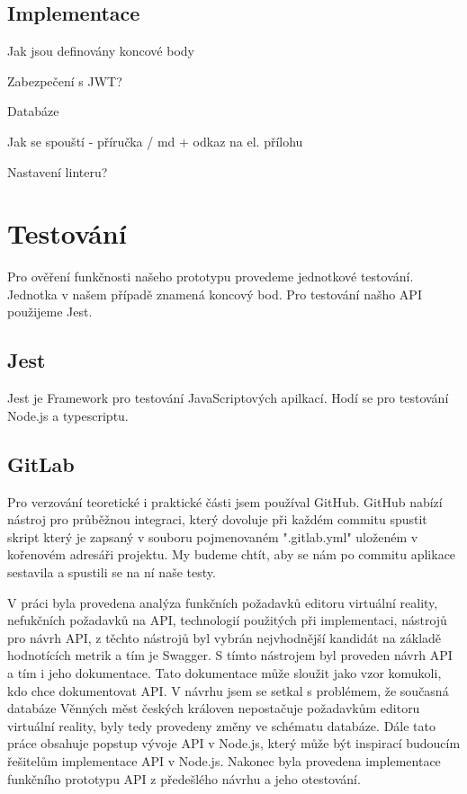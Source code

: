 \documentclass[thesis=B,czech]{FITthesis}[2012/06/26]
\begin{document}
    \section{Implementace}
        Jak jsou definovány koncové body
        
        Zabezpečení s JWT?
        
        Databáze
        
        Jak se spouští - příručka / md + odkaz na el. přílohu
        
        Nastavení linteru?
        
\chapter{Testování}
    Pro ověření funkčnosti našeho prototypu provedeme jednotkové testování. Jednotka v našem případě znamená koncový bod. Pro testování našho API použijeme Jest.

    \section{Jest}
    Jest je Framework pro testování JavaScriptových apilkací. Hodí se pro testování Node.js a typescriptu.


    \section{GitLab}
    Pro verzování teoretické i praktické části jsem používal GitHub. GitHub nabízí nástroj pro průběžnou integraci, který dovoluje při každém commitu spustit skript který je zapsaný v souboru pojmenovaném ".gitlab.yml" uloženém v kořenovém adresáři projektu. My budeme chtít, aby se nám po commitu aplikace sestavila a spustili se na ní naše testy.
    

\begin{conclusion}
    V práci byla provedena analýza funkčních požadavků editoru virtuální reality, nefukčních požadavků na API, technologií použitých při implementaci, nástrojů pro návrh API, z těchto nástrojů byl vybrán nejvhodnější kandidát na základě hodnotících metrik a tím je Swagger. S tímto nástrojem byl proveden návrh API a tím i jeho dokumentace. Tato dokumentace může sloužit jako vzor komukoli, kdo chce dokumentovat API.
    V návrhu jsem se setkal s problémem, že současná databáze Věnných měst českých královen nepostačuje požadavkům editoru virtuální reality, byly tedy provedeny změny ve schématu databáze.
    Dále tato práce obsahuje popstup vývoje API v Node.js, který může být inspirací budoucím řešitelům implementace API v Node.js.
    Nakonec byla provedena implementace funkčního prototypu API z předešlého návrhu a jeho otestování.

\end{conclusion}
\end{document}
